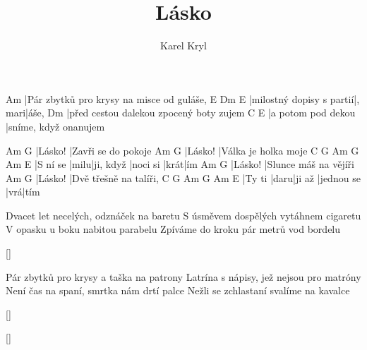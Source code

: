 \documentclass{song}
\title{Lásko}
\author{Karel Kryl}
\begin{document}
\strophe
Am
|Pár zbytků pro krysy na misce od guláše,
E                        Dm     E
|milostný dopisy s partií|, mari|áše,
Dm
|před cestou dalekou zpocený boty zujem
C                  E
|a potom pod dekou |sníme, když onanujem
\endstrophe

Am      G
|Lásko! |Zavři se do pokoje
Am      G
|Lásko! |Válka je holka moje
C        G    Am        G        Am   E
|S ní se |milu|ji, když |noci si |krát|ím
Am      G
|Lásko! |Slunce máš na vějíři
Am      G
|Lásko! |Dvě třešně na talíři,
C      G    Am     G          Am  E
|Ty ti |daru|ji až |jednou se |vrá|tím
\endstrophe

\strophe*
Dvacet let necelých, odznáček na baretu
S úsměvem dospělých vytáhnem cigaretu
V opasku u boku nabitou parabelu
Zpíváme do kroku pár metrů vod bordelu
\endstrophe

\ref{}

\strophe*
Pár zbytků pro krysy a taška na patrony
Latrína s nápisy, jež nejsou pro matróny
Není čas na spaní, smrtka nám drtí palce
Nežli se zchlastaní svalíme na kavalce
\endstrophe

\ref{}

\ref{}
\end{document}
